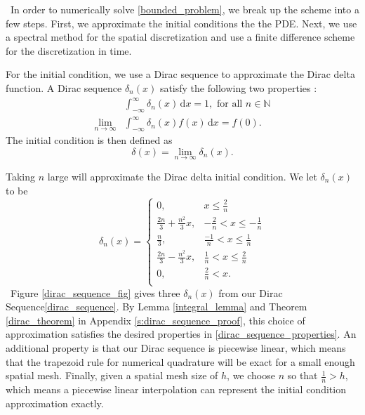 \documentclass{siamart1116}
\newcommand{\LB}[1]{{\color{blue}~\textsf{#1}}}
\begin{document}
\LB{In order to numerically solve \eqref{bounded_problem}, we break up the scheme into a few steps. First, we approximate the initial conditions the the PDE. Next, we use a spectral method for the spatial discretization and use a finite difference scheme for the discretization in time.}

For the initial condition, we use a Dirac sequence to approximate the Dirac delta function.
A Dirac sequence $\delta_n(x)$ satisfy the following two properties \cite[Sec. 8.7]{arfken_1985}:
\begin{align}
&\int_{-\infty}^{\infty}\delta_n(x)\,\mathrm{d}x=1, \text{ for all } n\in\mathbb{N}\nonumber\\
\lim_{n\to\infty}&\int_{-\infty}^{\infty}\delta_n(x)f(x)\,\mathrm{d}x = f(0). \label{dirac_sequence_properties}
\end{align}
The initial condition is then defined as
$$\delta(x)=\lim_{n\to\infty}\delta_n(x).$$

Taking $n$ large will approximate the Dirac delta initial condition. We let $\delta_n(x)$ to be 
\begin{equation}\label{dirac_sequence}
\delta_n(x) = \begin{cases}
0,& x\leq\frac{2}{n}\\
\frac{2n}{3} + \frac{n^2}{3}x,& -\frac{2}{n}<x\leq-\frac{1}{n}\\
\frac{n}{3},& \frac{-1}{n}<x\leq\frac{1}{n}\\
\frac{2n}{3} - \frac{n^2}{3}x,& \frac{1}{n}<x\leq\frac{2}{n}\\
0,& \frac{2}{n}<x.\\
\end{cases}
\end{equation}
\LB{Figure \ref{dirac_sequence_fig} gives three $\delta_n(x)$ from our Dirac Sequence\eqref{dirac_sequence}.
By Lemma \ref{integral_lemma} and Theorem \ref{dirac_theorem} in Appendix \ref{s:dirac_sequence_proof}, this choice of approximation satisfies the desired properties in \eqref{dirac_sequence_properties}. An additional property is that our Dirac sequence is piecewise linear, which means that the trapezoid rule for numerical quadrature will be exact for a small enough spatial mesh. Finally, given a spatial mesh size of $h$, we choose $n$ so that $\frac{1}{n}>h$, which means a piecewise linear interpolation can represent the initial condition approximation exactly.}
\end{document}
